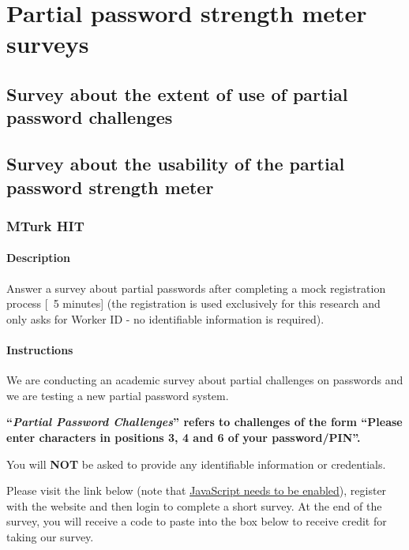
\chapter{Partial password strength meter surveys}
  \label{ap:Surveys}
  \section{Survey about the extent of use of partial password challenges}
    \label{aps:survey_extent}
    

  \section{Survey about the usability of the partial password strength meter}
    \label{aps:survey_usability}

    \subsection{MTurk HIT}
      \label{apss:usability_hit}

      \subsubsection{Description}
        \label{apsss:usability_hit_descr}
        Answer a survey about partial passwords after completing a mock registration process [~5 minutes] (the registration is used exclusively for this research and only asks for Worker ID - no identifiable information is required).

      \subsubsection{Instructions}
        \label{apsss:usability_hit_instr}
        We are conducting an academic survey about partial challenges on passwords and we are testing a new partial password system.

        \textbf{``\emph{Partial Password Challenges}'' refers to challenges of the form ``Please enter characters in positions 3, 4 and 6 of your password/PIN''.}

        You will \textbf{NOT} be asked to provide any identifiable information or credentials.

        Please visit the link below (note that \underline{JavaScript needs to be enabled}), register with the website and then login to complete a short survey. At the end of the survey, you will receive a code to paste into the box below to receive credit for taking our survey.

